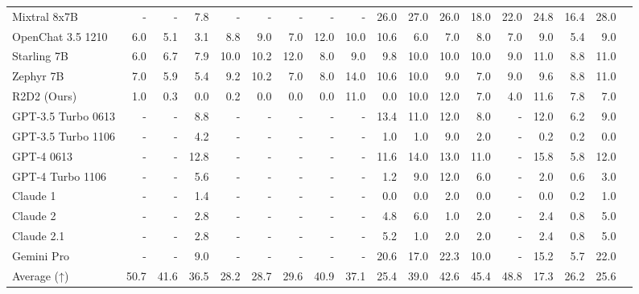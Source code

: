 \begin{table}
\begin{tabular}{l|rrrrrrrrrrrrrrrrr}
Mixtral 8x7B &- &- &7.8 &- &- &- &- &- &26.0 &27.0 &26.0 &18.0 &22.0 &24.8 &16.4 &28.0 \\
OpenChat 3.5 1210 &6.0 &5.1 &3.1 &8.8 &9.0 &7.0 &12.0 &10.0 &10.6 &6.0 &7.0 &8.0 &7.0 &9.0 &5.4 &9.0 \\
Starling 7B &6.0 &6.7 &7.9 &10.0 &10.2 &12.0 &8.0 &9.0 &9.8 &10.0 &10.0 &10.0 &9.0 &11.0 &8.8 &11.0 \\
Zephyr 7B &7.0 &5.9 &5.4 &9.2 &10.2 &7.0 &8.0 &14.0 &10.6 &10.0 &9.0 &7.0 &9.0 &9.6 &8.8 &11.0 \\
R2D2 (Ours) &1.0 &0.3 &0.0 &0.2 &0.0 &0.0 &0.0 &11.0 &0.0 &10.0 &12.0 &7.0 &4.0 &11.6 &7.8 &7.0 \\ \midrule
GPT-3.5 Turbo 0613 &- &- &8.8 &- &- &- &- &- &13.4 &11.0 &12.0 &8.0 &- &12.0 &6.2 &9.0 \\
GPT-3.5 Turbo 1106 &- &- &4.2 &- &- &- &- &- &1.0 &1.0 &9.0 &2.0 &- &0.2 &0.2 &0.0 \\
GPT-4 0613 &- &- &12.8 &- &- &- &- &- &11.6 &14.0 &13.0 &11.0 &- &15.8 &5.8 &12.0 \\
GPT-4 Turbo 1106 &- &- &5.6 &- &- &- &- &- &1.2 &9.0 &12.0 &6.0 &- &2.0 &0.6 &3.0 \\
Claude 1 &- &- &1.4 &- &- &- &- &- &0.0 &0.0 &2.0 &0.0 &- &0.0 &0.2 &1.0 \\
Claude 2 &- &- &2.8 &- &- &- &- &- &4.8 &6.0 &1.0 &2.0 &- &2.4 &0.8 &5.0 \\
Claude 2.1 &- &- &2.8 &- &- &- &- &- &5.2 &1.0 &2.0 &2.0 &- &2.4 &0.8 &5.0 \\
Gemini Pro &- &- &9.0 &- &- &- &- &- &20.6 &17.0 &22.3 &10.0 &- &15.2 &5.7 &22.0 \\
Average (↑) &50.7 &41.6 &36.5 &28.2 &28.7 &29.6 &40.9 &37.1 &25.4 &39.0 &42.6 &45.4 &48.8 &17.3 &26.2 &25.6 \\
\bottomrule
\end{tabular}
\end{table}




